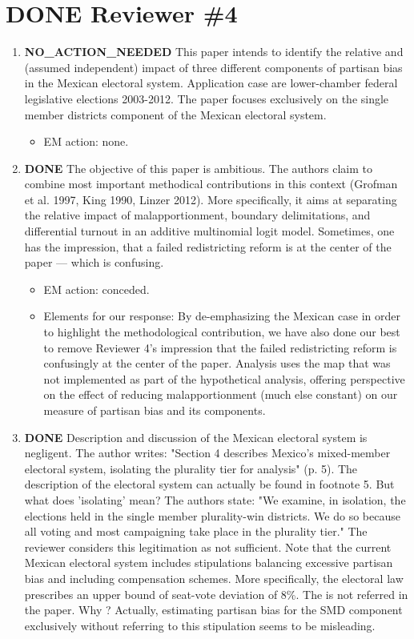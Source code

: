 \documentclass{article}
\begin{document}
\section{{\bfseries\sffamily DONE} Reviewer \#4}
\label{sec:orgheadline30}
\begin{enumerate}
\item {\bfseries\sffamily NO\_ACTION\_NEEDED} This paper intends to identify the relative and (assumed independent) impact of three different components of partisan bias  in the Mexican electoral system. Application case are lower-chamber federal legislative elections 2003-2012. The paper focuses exclusively on the single member districts  component of the Mexican electoral system.
\label{sec:orgheadline20}
\begin{itemize}
\item EM action: none.
\end{itemize}
\item {\bfseries\sffamily DONE} The objective of this paper is ambitious. The authors claim to combine most important methodical contributions in this context (Grofman et al. 1997, King 1990, Linzer 2012).  More specifically, it aims at separating the relative impact of malapportionment, boundary delimitations, and differential turnout in an additive multinomial logit model. Sometimes, one has the impression, that a failed redistricting reform is at the center of the paper --- which is confusing.
\label{sec:orgheadline21}
\begin{itemize}
\item EM action: conceded.
\item Elements for our response: By de-emphasizing the Mexican case in order to highlight the methodological contribution, we have also done our best to remove Reviewer 4's impression that the failed redistricting reform is confusingly at the center of the paper. Analysis uses the map that was not implemented as part of the hypothetical analysis, offering perspective on the effect of reducing malapportionment (much else constant) on our measure of partisan bias and its components.
\end{itemize}
\item {\bfseries\sffamily DONE} Description and discussion of the Mexican electoral system is negligent. The author writes: "Section 4 describes Mexico's mixed-member electoral system, isolating the plurality tier for analysis" (p. 5). The description of the electoral system can actually be found in footnote 5. But  what does 'isolating' mean? The authors state: "We examine, in isolation, the elections held in the single member plurality-win districts. We do so because all voting and most campaigning take place in the plurality tier." The reviewer considers this legitimation as not sufficient. Note that the current Mexican electoral system includes stipulations balancing excessive partisan bias and including compensation schemes. More specifically, the electoral law prescribes an upper bound of seat-vote deviation of 8\%. The is not referred in the paper. Why ? Actually, estimating partisan bias for the SMD component exclusively without referring to this stipulation seems to be misleading.

\end{enumerate}
\end{document}
